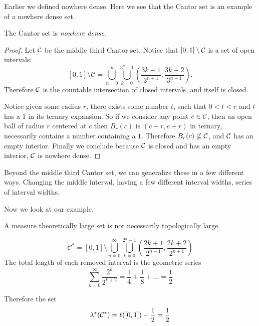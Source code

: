 Earlier we defined nowhere dense. Here we see that the Cantor set is an example of a nowhere dense set.  
\begin{claim}The Cantor set is \textit{nowhere dense}.  
\end{claim}  
\begin{proof}
    Let $\mathcal{C}$ be the middle third Cantor set.  Notice that $[0,1]\setminus \mathcal{C}$ is a set of open intervals: 
    $$ [0,1] \setminus \mathcal{C} =\bigcup_{n=0}^\infty\bigcup_{k=0}^{3^n-1}\left(\frac{3k+1}{3^{n+1}},\frac{3k+2}{3^{n+1}}\right). $$
    Therefore $\mathcal{C}$ is the countable intersection of closed intervals, and itself is closed.  
    
    Notice given some radius $r$, there exists some number $t$, such that $0<t<r$ and $t$ has a 1 in its ternary expansion.  So if we consider any point $c \in \mathcal{C}$, then an open ball of radius $r$ centered at $c$ then $B_r(c)$ is $(c-r, c+r)$ in ternary, necessarily contains a number containing a $1$.  Therefore $B_r(c) \not\subseteq \mathcal{C}$, and $\mathcal{C}$ has an empty interior.  Finally we conclude because $\mathcal{C}$ is closed and has an empty interior, $\mathcal{C}$ is nowhere dense.      
\end{proof}
Beyond the middle third Cantor set, we can generalize these in a few different ways.  Changing the middle interval, having a few different interval widths, series of interval widths. 

Now we look at our example.  
\begin{example}A measure theoretically large set is not necessarily topologically large.

    $$\mathcal{C^*} = [0,1] \setminus \bigcup_{n=0}^\infty\bigcup_{k=0}^{2^n-1}\left(\frac{2k+1}{2^{n+1}},\frac{2k+2}{2^{n+1}}\right)$$
The total length of each removed interval is the geometric series 
$$\sum_{k=0}^\infty \frac{2^k}{2^{k+2}} = \frac{1}{4} + \frac{1}{8} + \dots = \frac{1}{2}$$

Therefore the set $$\lambda^*(\mathcal{C}^*) = \ell([0,1]) - \frac{1}{2} = \frac{1}{2}$$
\end{example}
